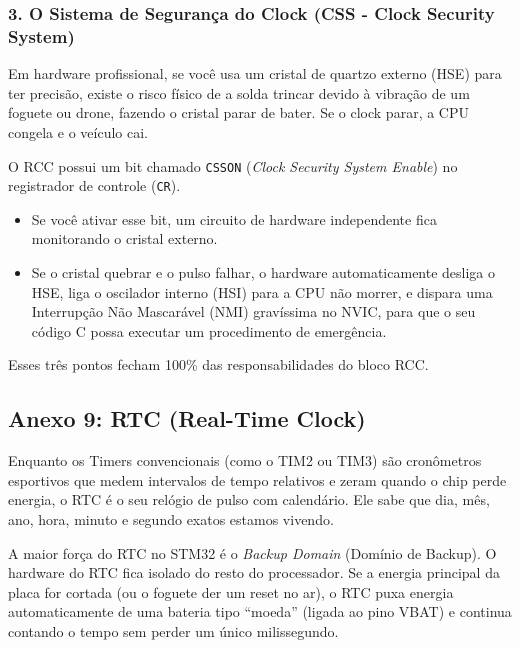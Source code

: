 \documentclass[12pt,a4paper]{article}
\begin{document}
\subsubsection*{3. O Sistema de Segurança do Clock (CSS - Clock Security System)}
Em hardware profissional, se você usa um cristal de quartzo externo (HSE) para ter precisão, existe o risco físico de a solda trincar devido à vibração de um foguete ou drone, fazendo o cristal parar de bater. Se o clock parar, a CPU congela e o veículo cai.



O RCC possui um bit chamado \texttt{CSSON} (\textit{Clock Security System Enable}) no registrador de controle (\texttt{CR}).
\begin{itemize}
    \item Se você ativar esse bit, um circuito de hardware independente fica monitorando o cristal externo.
    \item Se o cristal quebrar e o pulso falhar, o hardware automaticamente desliga o HSE, liga o oscilador interno (HSI) para a CPU não morrer, e dispara uma Interrupção Não Mascarável (NMI) gravíssima no NVIC, para que o seu código C possa executar um procedimento de emergência.
\end{itemize}

Esses três pontos fecham 100\% das responsabilidades do bloco RCC.

\newpage
\subsection*{Anexo 9: RTC (Real-Time Clock)}
\label{anexo:9}

Enquanto os Timers convencionais (como o TIM2 ou TIM3) são cronômetros esportivos que medem intervalos de tempo relativos e zeram quando o chip perde energia, o RTC é o seu relógio de pulso com calendário. Ele sabe que dia, mês, ano, hora, minuto e segundo exatos estamos vivendo.

A maior força do RTC no STM32 é o \textit{Backup Domain} (Domínio de Backup). O hardware do RTC fica isolado do resto do processador. Se a energia principal da placa for cortada (ou o foguete der um reset no ar), o RTC puxa energia automaticamente de uma bateria tipo ``moeda'' (ligada ao pino VBAT) e continua contando o tempo sem perder um único milissegundo.
\end{document}

